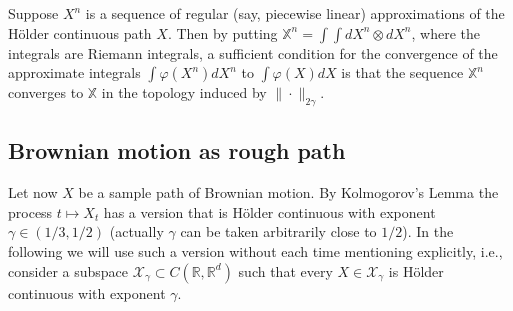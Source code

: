 \documentclass[a4paper,11pt]{article}
\newcommand{\R}{\mathbb{R}}
\newcommand{\X}{\mathcal{X}}
\begin{document}
Suppose $X^n$ is a sequence of regular (say, piecewise linear)
approximations of the H\"older continuous path $X$. Then by putting 
$\mathbb{X}^n = \int \int dX^n\otimes  dX^n $, where the integrals 
are Riemann integrals, a sufficient condition for the convergence of 
the approximate integrals $\int \varphi(X^n) dX^n$ to $\int \varphi(X) 
dX$ is that the sequence $\mathbb{X}^n$ converges to $\mathbb{X}$ in 
the topology induced by $\|\cdot\|_{2\gamma}$.


\subsection{Brownian motion as rough path}

Let now $X$ be a sample path of Brownian motion. By Kolmogorov's Lemma 
the process $t \mapsto X_t$ has a version that is H\"older continuous 
with exponent $\gamma \in(1/3,1/2)$ (actually $\gamma$ can be taken 
arbitrarily close to $1/2$). In the following we will use such a 
version without each time mentioning explicitly, i.e., consider a 
subspace $\X_\gamma \subset C(\R,\R^d)$ such that every $X \in 
\X_\gamma$ is H\"older continuous with exponent $\gamma$.
 
\end{document}
